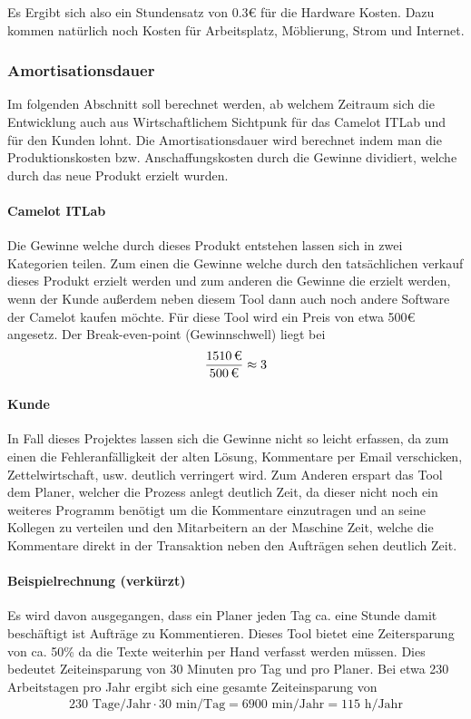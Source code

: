 Es Ergibt sich also ein Stundensatz von 0.3€ für die Hardware Kosten. Dazu kommen natürlich noch Kosten für Arbeitsplatz, Möblierung, Strom und Internet.

\subsubsection{Amortisationsdauer}
\label{sec:Amortisationsdauer}
Im folgenden Abschnitt soll berechnet werden, ab welchem Zeitraum sich die Entwicklung auch aus Wirtschaftlichem Sichtpunk für das Camelot ITLab und für den Kunden lohnt. Die Amortisationsdauer wird berechnet indem man die Produktionskosten bzw. Anschaffungskosten durch die Gewinne dividiert, welche durch das neue Produkt erzielt wurden.

\paragraph{Camelot ITLab}
Die Gewinne welche durch dieses Produkt entstehen lassen sich in zwei Kategorien teilen. Zum einen die Gewinne welche durch den tatsächlichen verkauf dieses Produkt erzielt werden und zum anderen die Gewinne die erzielt werden, wenn der Kunde außerdem neben diesem Tool dann auch noch andere Software der Camelot kaufen möchte. Für diese Tool wird ein Preis von etwa 500€ angesetz. Der Break-even-point (Gewinnschwell) liegt bei
\begin{eqnarray}
\frac{\eur{1510}}{\eur{500}} \approx 3 
\end{eqnarray}

\paragraph{Kunde}
In Fall dieses Projektes lassen sich die Gewinne nicht so leicht erfassen, da zum einen die Fehleranfälligkeit der alten Lösung, Kommentare per Email verschicken, Zettelwirtschaft, usw. deutlich verringert wird. Zum Anderen erspart das Tool dem Planer, welcher die Prozess anlegt deutlich Zeit, da dieser nicht noch ein weiteres Programm benötigt um die Kommentare einzutragen und an seine Kollegen zu verteilen und den Mitarbeitern an der Maschine Zeit, welche die Kommentare direkt in der Transaktion neben den Aufträgen sehen deutlich Zeit. 

\paragraph{Beispielrechnung (verkürzt)}
Es wird davon ausgegangen, dass ein Planer jeden Tag ca. eine Stunde damit beschäftigt ist Aufträge zu Kommentieren. Dieses Tool bietet eine Zeitersparung von ca. 50\% da die Texte weiterhin per Hand verfasst werden müssen. Dies bedeutet Zeiteinsparung von 30 Minuten pro Tag und pro Planer. Bei etwa 230 Arbeitstagen pro Jahr ergibt sich eine gesamte Zeiteinsparung von  
\begin{eqnarray}
230 \mbox{ Tage/Jahr} \cdot 30 \mbox{ min/Tag} = 6900 \mbox{ min/Jahr} = 115 \mbox{ h/Jahr} 
\end{eqnarray}

